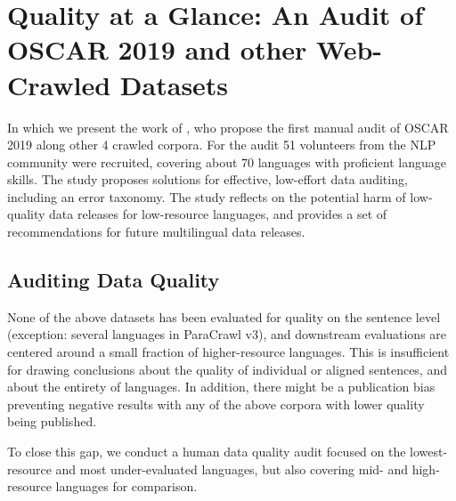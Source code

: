 \chapter{Quality at a Glance: An Audit of OSCAR 2019 and other Web-Crawled Datasets}

\begin{center}
    \begin{minipage}{0.66\textwidth}
        \begin{small}
            In which we present the work of \citet{kreutzer-etal-2021-quality}, who propose the first manual audit of OSCAR 2019 along other 4 crawled corpora. For the audit 51 volunteers from the NLP community were recruited, covering about 70 languages with proficient language skills. The study proposes solutions for effective, low-effort data auditing, including an error taxonomy. The study reflects on the potential harm of low-quality data releases for low-resource languages, and provides a set of recommendations for future multilingual data releases.
        \end{small}
    \end{minipage}
    \vspace{0.5cm}
\end{center}

\section{Auditing Data Quality}\label{sec:audit}
None of the above datasets has been evaluated for quality on the sentence level (exception: several languages in ParaCrawl v3), and downstream evaluations are centered around a small fraction of higher-resource languages. This is insufficient for drawing conclusions about the quality of individual or aligned sentences, and about the entirety of languages. In addition, there might be a publication bias preventing negative results with any of the above corpora with lower quality being published.

To close this gap, we conduct a human data quality audit focused on the lowest-resource and most under-evaluated languages, but also covering mid- and high-resource languages for comparison.


